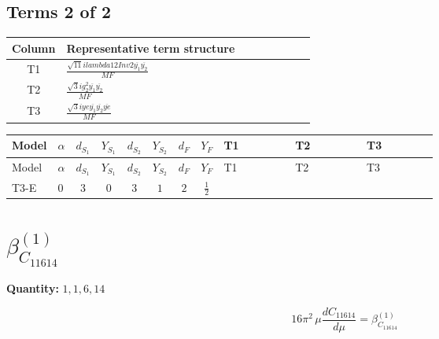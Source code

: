 \documentclass[8pt]{article}
\begin{document}
\begin{landscape}
\subsection*{Terms 2 of 2}
\begin{center}
\begin{tabular}{@{}c >{\raggedright\arraybackslash}p{0.82\linewidth}@{}}
\toprule
Column & Representative term structure \\
\midrule
T1 & \(\displaystyle \frac{\sqrt{11} i lambda12Inv2 \overline{y_{1}} \overline{y_{2}}}{MF}\) \\
\midrule
T2 & \(\displaystyle \frac{\sqrt{3} i g_{2}^{2} \overline{y_{1}} \overline{y_{2}}}{MF}\) \\
\midrule
T3 & \(\displaystyle \frac{\sqrt{3} i ye \overline{y_{1}} \overline{y_{2}} \overline{ye}}{MF}\) \\
\midrule
\bottomrule
\end{tabular}
\end{center}
\smallskip
\tiny
\begin{longtable}{@{}llcccccc >{\raggedright\arraybackslash}p{0.21\linewidth} >{\raggedright\arraybackslash}p{0.21\linewidth} >{\raggedright\arraybackslash}p{0.21\linewidth}@{}}
\toprule
Model & $\alpha$ & $d_{S_1}$ & $Y_{S_1}$ & $d_{S_2}$ & $Y_{S_2}$ & $d_F$ & $Y_F$ & T1 & T2 & T3 \\
\midrule
\endfirsthead
\toprule
Model & $\alpha$ & $d_{S_1}$ & $Y_{S_1}$ & $d_{S_2}$ & $Y_{S_2}$ & $d_F$ & $Y_F$ & T1 & T2 & T3 \\
\midrule
\endhead
T3-E & $0$ & $3$ & $0$ & $3$ & $1$ & $2$ & $\frac{1}{2}$ & \scriptsize\adjustbox{max width=\linewidth}{$\begin{gathered} \frac{3 \sqrt{11} i lambda12Inv2 \overline{y_{1}} \overline{y_{2}}}{22 MF}\end{gathered}$} & \scriptsize\adjustbox{max width=\linewidth}{$\begin{gathered} \frac{11 \sqrt{3} i g_{2}^{2} \overline{y_{1}} \overline{y_{2}}}{8 MF}\end{gathered}$} & \scriptsize\adjustbox{max width=\linewidth}{$\begin{gathered} - \frac{\sqrt{3} i ye \overline{y_{1}} \overline{y_{2}} \overline{ye}}{12 MF}\end{gathered}$} \\
\midrule
\bottomrule
\end{longtable}
\clearpage
\section*{$\beta_{C_{11614}}^{(1)}$}
\noindent\textbf{Quantity: }$\mathrm{1,1,6,14}$\par\smallskip
\[16\pi^2\,\mu\frac{d C_{11614}}{d\mu}=\beta_{C_{11614}}^{(1)}\]

\end{landscape}
\end{document}
